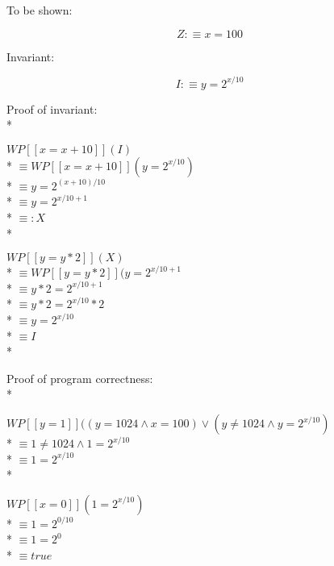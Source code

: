 \documentclass{article}
\begin{document}
To be shown:

$$ Z:\equiv x=100 $$

Invariant:

$$ I:\equiv y=2^{x/10} $$

Proof of invariant: \\*

$ WP[\![x=x+10]\!](I) $ \\*
$ \equiv WP[\![x=x+10]\!](y=2^{x/10}) $ \\*
$ \equiv y=2^{(x+10)/10} $ \\*
$ \equiv y=2^{x/10+1} $ \\*
$ \equiv: X $ \\*

$ WP[\![y=y*2]\!](X) $ \\*
$ \equiv WP[\![y=y*2]\!](y=2^{x/10+1} $ \\*
$ \equiv y*2=2^{x/10+1} $ \\*
$ \equiv y*2=2^{x/10}*2 $ \\*
$ \equiv y=2^{x/10} $ \\*
$ \equiv I $ \\*

Proof of program correctness: \\*

$ WP[\![y=1]\!]((y=1024 \land x=100) \lor (y\ne 1024 \land y=2^{x/10}) $ \\*
$ \equiv 1\ne 1024 \land 1=2^{x/10} $ \\*
$ \equiv 1=2^{x/10} $ \\*

$ WP[\![x=0]\!](1=2^{x/10}) $ \\*
$ \equiv 1=2^{0/10} $ \\*
$ \equiv 1=2^0 $ \\*
$ \equiv true $
\end{document}
